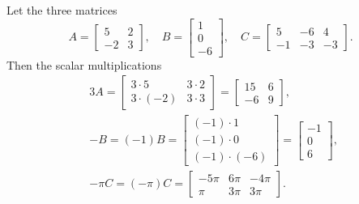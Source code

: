 \begin{example} 
Let the three matrices
\begin{equation*}
A=\begin{bmatrix} 5 & 2\\ -2 & 3 \end{bmatrix},\quad
B=\begin{bmatrix} 1\\ 0\\ -6 \end{bmatrix},\quad
C=\begin{bmatrix} 5 & -6 & 4\\ -1 & -3 & -3 \end{bmatrix}.
\end{equation*}
Then the scalar multiplications
\begin{eqnarray*}
&&3A=\begin{bmatrix} 3\cdot5 & 3\cdot2\\ 3\cdot(-2) & 3\cdot3 \end{bmatrix}
=\begin{bmatrix} 15 & 6\\ -6 & 9 \end{bmatrix},\quad
\\&&-B=(-1)B=\begin{bmatrix} (-1)\cdot1\\ (-1)\cdot0\\ (-1)\cdot(-6) \end{bmatrix}
=\begin{bmatrix} -1\\ 0\\ 6 \end{bmatrix},\quad
\\&&-\pi C=(-\pi)C=\begin{bmatrix} -5\pi & 6\pi & -4\pi\\ \pi & 3\pi & 3\pi \end{bmatrix}.
\end{eqnarray*}
\end{example}


